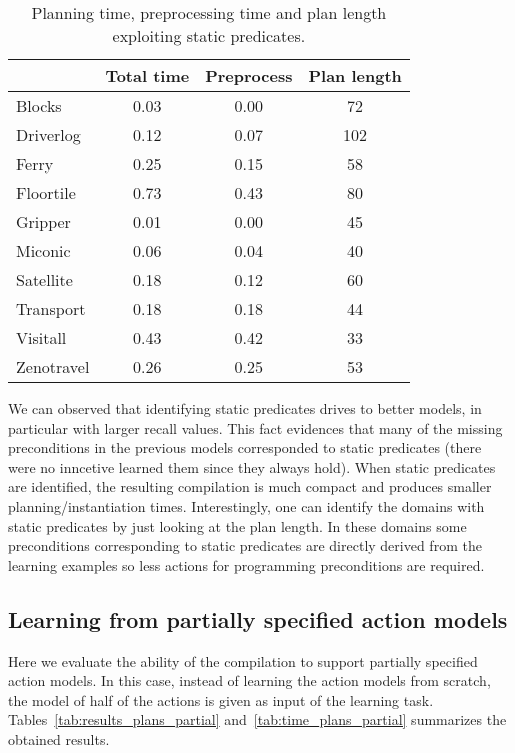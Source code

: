 \documentclass[letterpaper]{article} %
\begin{document}
\begin{table}[hbt!]
\begin{footnotesize}
	\begin{center}
		\begin{tabular}{l|c|c|c|}			
			 & Total time & Preprocess & Plan length  \\
			\hline
			Blocks & 0.03 & 0.00 & 72 \\
			Driverlog & 0.12 & 0.07 & 102 \\
			Ferry & 0.25 & 0.15 & 58 \\
			Floortile & 0.73 & 0.43 & 80 \\
			Gripper & 0.01 & 0.00 & 45 \\
			Miconic & 0.06 & 0.04 & 40 \\
			Satellite & 0.18 & 0.12 & 60 \\
			Transport & 0.18 & 0.18 & 44 \\
			Visitall & 0.43 & 0.42 & 33 \\
			Zenotravel & 0.26 & 0.25 & 53
		\end{tabular}
	\end{center}
        \end{footnotesize}
	\caption{\small Planning time, preprocessing time and plan length exploiting static predicates.}
	\label{tab:time_plans_static}	
\end{table}

We can observed that identifying static predicates drives to better models, in particular with larger recall values. This fact evidences that many of the missing preconditions in the previous models corresponded to static predicates (there were no inncetive learned them since they always hold). When static predicates are identified, the resulting compilation is much compact and produces smaller planning/instantiation times. Interestingly, one can identify the domains with static predicates by just looking at the plan length. In these domains some preconditions corresponding to static predicates are directly derived from the learning examples so less actions for programming preconditions are required.


\subsection{Learning from partially specified action models}

Here we evaluate the ability of the compilation to support partially specified action models. In this case, instead of learning the action models from scratch, the model of half of the actions is given as input of the learning task. Tables~\ref{tab:results_plans_partial} and~\ref{tab:time_plans_partial} summarizes the obtained results.	
\end{document}
